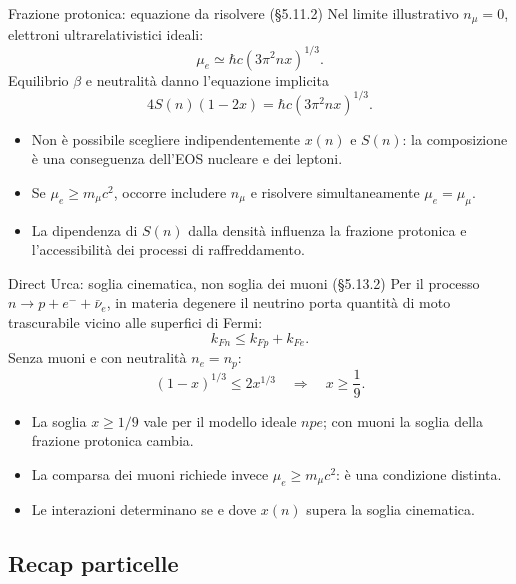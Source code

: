 \begin{frame}[t]{Frazione protonica: equazione da risolvere (§5.11.2)}
\small
Nel limite illustrativo $n_\mu=0$, elettroni ultrarelativistici ideali:
\[
\mu_e\simeq\hbar c(3\pi^2nx)^{1/3}.
\]
Equilibrio $\beta$ e neutralità danno l'equazione implicita
\[
4S(n)(1-2x)=\hbar c(3\pi^2nx)^{1/3}.
\]
\begin{itemize}
\item Non è possibile scegliere indipendentemente $x(n)$ e $S(n)$: la composizione è una conseguenza dell'EOS nucleare e dei leptoni.
\item Se $\mu_e\ge m_\mu c^2$, occorre includere $n_\mu$ e risolvere simultaneamente $\mu_e=\mu_\mu$.
\item La dipendenza di $S(n)$ dalla densità influenza la frazione protonica e l'accessibilità dei processi di raffreddamento.
\end{itemize}
\end{frame}

\begin{frame}[t]{Direct Urca: soglia cinematica, non soglia dei muoni (§5.13.2)}
\small
Per il processo $n\to p+e^-+\bar\nu_e$, in materia degenere il neutrino porta quantità di moto trascurabile vicino alle superfici di Fermi:
\[
k_{Fn}\le k_{Fp}+k_{Fe}.
\]
Senza muoni e con neutralità $n_e=n_p$:
\[
(1-x)^{1/3}\le2x^{1/3}
\quad\Longrightarrow\quad x\ge\frac19.
\]
\begin{itemize}
\item La soglia $x\ge1/9$ vale per il modello ideale $npe$; con muoni la soglia della frazione protonica cambia.
\item La comparsa dei muoni richiede invece $\mu_e\ge m_\mu c^2$: è una condizione distinta.
\item Le interazioni determinano se e dove $x(n)$ supera la soglia cinematica.
\end{itemize}
\end{frame}

\subsection{Recap particelle}

